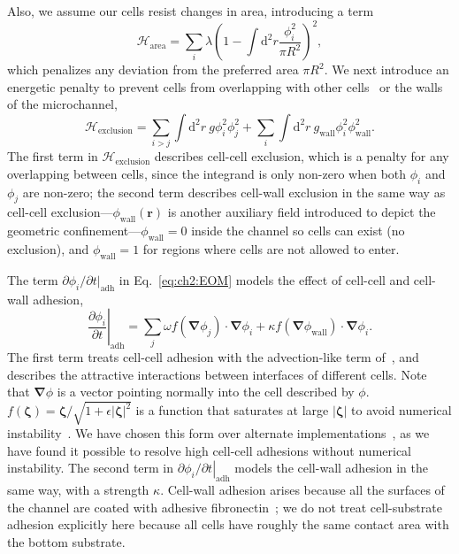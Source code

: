 Also, we assume our cells resist changes in area, introducing a term~\cite{zhang2020active, mueller2019emergence}
\begin{equation*}
\mathcal{H}_{\text{area}}=\sum_i\lambda\left(1-\int\mathrm{d}^2 r\frac{\phi_i^2}{\pi R^2}\right)^2,
\end{equation*}
which penalizes any deviation from the preferred area $\pi R^2$.
We next introduce an energetic penalty to prevent cells from overlapping with other cells~\cite{mueller2019emergence} or the walls of the microchannel,
\begin{equation*}
\mathcal{H}_{\text{exclusion}}=\sum_{i>j}\int\mathrm{d}^2r~g\phi_i^2\phi_j^2+\sum_i\int\mathrm{d}^2 r~g_\textrm{wall}\phi_i^2 \phi_\textrm{wall}^2.
\end{equation*}
The first term in $\mathcal{H}_{\text{exclusion}}$ describes cell-cell exclusion, which is a penalty for any overlapping between cells, since the integrand is only non-zero when both $\phi_i$ and $\phi_j$ are non-zero; the second term describes cell-wall exclusion in the same way as cell-cell exclusion---$\phi_\textrm{wall}(\mathbf{r})$ is another auxiliary field introduced to depict the geometric confinement---$\phi_\textrm{wall} = 0$ inside the channel so cells can exist (no exclusion), and $\phi_\textrm{wall} = 1$ for regions where cells are not allowed to enter.

The term $\partial\phi_i/\partial t |_\textrm{adh}$ in Eq.~\eqref{eq:ch2:EOM} models the effect of cell-cell and cell-wall adhesion,
\begin{equation*}
\left.\frac{\partial\phi_i}{\partial t}\right|_\textrm{adh} = \sum_j\omega f(\bm{\nabla}\phi_j)\cdot\bm{\nabla}\phi_i + \kappa f(\bm{\nabla}\phi_\textrm{wall})\cdot\bm{\nabla}\phi_i.
\end{equation*}
The first term treats cell-cell adhesion with the advection-like term of~\cite{lober2015collisions}, and describes the attractive interactions between interfaces of different cells.
Note that $\bm{\nabla}\phi$ is a vector pointing normally into the cell described by $\phi$.
$f(\bm{\zeta})=\bm{\zeta}/\sqrt{1+\epsilon|\bm{\zeta}|^2}$ is a function that saturates at large $|\bm{\zeta}|$ to avoid numerical instability~\cite{lober2015collisions}.
We have chosen this form over alternate implementations~\cite{camley2014polarity, zadeh2022picking}, as we have found it possible to resolve high cell-cell adhesions without numerical instability.
The second term in $\left.\partial\phi_i/\partial t\right|_\textrm{adh}$ models the cell-wall adhesion in the same way, with a strength $\kappa$.
Cell-wall adhesion arises because all the surfaces of the channel are coated with adhesive fibronectin~\cite{law2023cytokinesis}; we do not treat cell-substrate adhesion explicitly here because all cells have roughly the same contact area with the bottom substrate.

